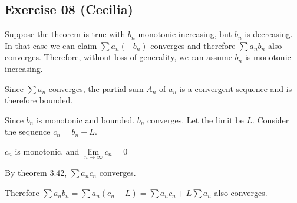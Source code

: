 \subsection*{Exercise 08 (Cecilia)}
\begin{flushleft}
Suppose the theorem is true with $ b_n $ monotonic increasing, but $ b_n $ is decreasing. In that case we can claim $ \sum a_n (-b_n) $ converges and therefore $ \sum a_n b_n $ also converges. Therefore, without loss of generality, we can assume $ b_n $ is monotonic increasing.
\vspace{10px}

Since $ \sum a_n $ converges, the partial sum $ A_n $ of $ a_n $ is a convergent sequence and is therefore bounded.
\vspace{10px}

Since $ b_n $ is monotonic and bounded. $ b_n $ converges. Let the limit be $ L $. Consider the sequence $ c_n = b_n - L $.
\vspace{10px}

$ c_n $ is monotonic, and $ \lim\limits_{n \to \infty} c_n = 0 $
\vspace{10px}

By theorem 3.42, $ \sum a_n c_n $ converges.
\vspace{10px}

Therefore $ \sum a_n b_n = \sum a_n (c_n + L) = \sum a_n c_n + L \sum a_n $ also converges.
\end{flushleft}